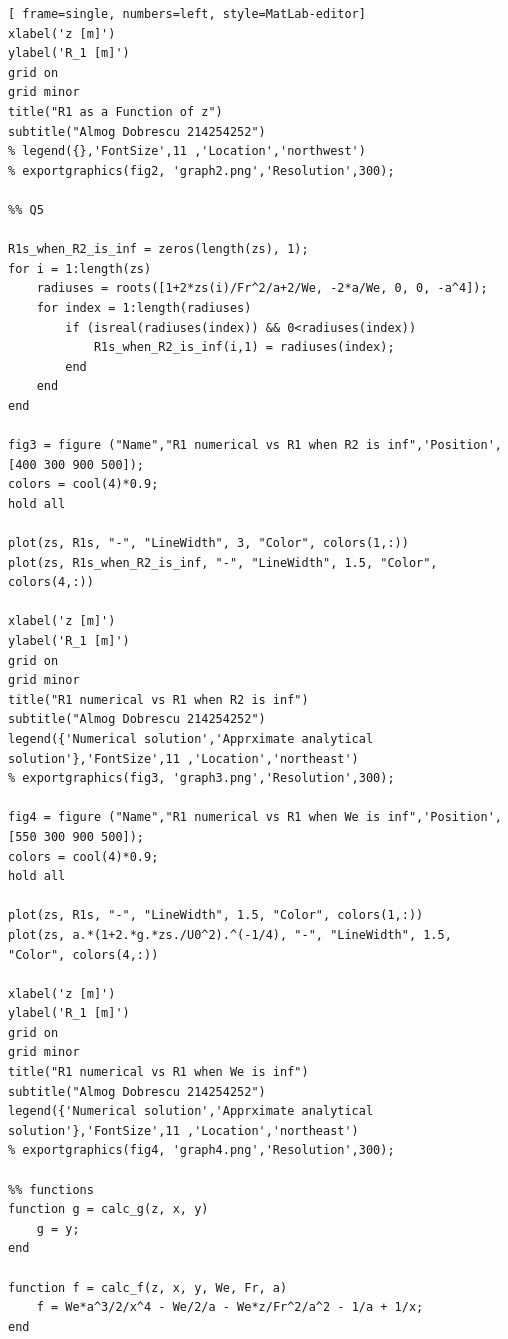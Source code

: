 \documentclass[11pt, a4paper]{article}
\begin{document}
\begin{lstlisting}[ frame=single, numbers=left, style=MatLab-editor]
xlabel('z [m]')
ylabel('R_1 [m]')
grid on
grid minor
title("R1 as a Function of z")
subtitle("Almog Dobrescu 214254252")
% legend({},'FontSize',11 ,'Location','northwest')
% exportgraphics(fig2, 'graph2.png','Resolution',300);

%% Q5

R1s_when_R2_is_inf = zeros(length(zs), 1);
for i = 1:length(zs)
    radiuses = roots([1+2*zs(i)/Fr^2/a+2/We, -2*a/We, 0, 0, -a^4]);
    for index = 1:length(radiuses) 
        if (isreal(radiuses(index)) && 0<radiuses(index))
            R1s_when_R2_is_inf(i,1) = radiuses(index);
        end
    end
end

fig3 = figure ("Name","R1 numerical vs R1 when R2 is inf",'Position',[400 300 900 500]);
colors = cool(4)*0.9;
hold all

plot(zs, R1s, "-", "LineWidth", 3, "Color", colors(1,:))
plot(zs, R1s_when_R2_is_inf, "-", "LineWidth", 1.5, "Color", colors(4,:))

xlabel('z [m]')
ylabel('R_1 [m]')
grid on
grid minor
title("R1 numerical vs R1 when R2 is inf")
subtitle("Almog Dobrescu 214254252")
legend({'Numerical solution','Apprximate analytical solution'},'FontSize',11 ,'Location','northeast')
% exportgraphics(fig3, 'graph3.png','Resolution',300);

fig4 = figure ("Name","R1 numerical vs R1 when We is inf",'Position',[550 300 900 500]);
colors = cool(4)*0.9;
hold all

plot(zs, R1s, "-", "LineWidth", 1.5, "Color", colors(1,:))
plot(zs, a.*(1+2.*g.*zs./U0^2).^(-1/4), "-", "LineWidth", 1.5, "Color", colors(4,:))

xlabel('z [m]')
ylabel('R_1 [m]')
grid on
grid minor
title("R1 numerical vs R1 when We is inf")
subtitle("Almog Dobrescu 214254252")
legend({'Numerical solution','Apprximate analytical solution'},'FontSize',11 ,'Location','northeast')
% exportgraphics(fig4, 'graph4.png','Resolution',300);

%% functions
function g = calc_g(z, x, y)
    g = y;
end

function f = calc_f(z, x, y, We, Fr, a)
    f = We*a^3/2/x^4 - We/2/a - We*z/Fr^2/a^2 - 1/a + 1/x;
end
\end{lstlisting}
\end{document}
